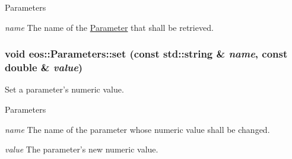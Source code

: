 \begin{DoxyParams}{Parameters}
\item[{\em name}]The name of the \hyperlink{classeos_1_1Parameter}{Parameter} that shall be retrieved. \end{DoxyParams}
\hypertarget{classeos_1_1Parameters_ae0024a5a443069e934fda8e257e6ecd6}{
\subsubsection[{set}]{\setlength{\rightskip}{0pt plus 5cm}void eos::Parameters::set (const std::string \& {\em name}, \/  const double \& {\em value})}}
\label{classeos_1_1Parameters_ae0024a5a443069e934fda8e257e6ecd6}
Set a parameter's numeric value.


\begin{DoxyParams}{Parameters}
\item[{\em name}]The name of the parameter whose numeric value shall be changed. \item[{\em value}]The parameter's new numeric value. \end{DoxyParams}


